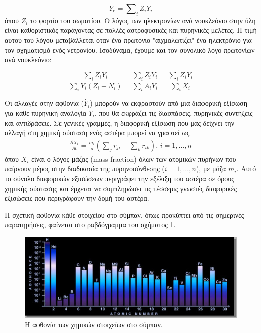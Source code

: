 \begin{equation}
Y_{e} = \sum\nolimits_{i} Z_{i} Y_{i}
\end{equation}
όπου $Z_{i}$ το φορτίο του σωματίου. Ο λόγος των ηλεκτρονίων ανά νουκλεόνιο στην ύλη είναι καθοριστικός παράγοντας σε πολλές αστροφυσικές και πυρηνικές μελέτες. Η τιμή αυτού του λόγου μεταβάλλεται όταν ένα πρωτόνιο "αιχμαλωτίζει" ένα ηλεκτρόνιο για τον σχηματισμό ενός νετρονίου.
Ισοδύναμα, έχουμε και τον συνολικό λόγο πρωτονίων ανά νουκλεόνιο:

\begin{equation}
\frac{\sum\nolimits_{i} Z_{i} Y_{i}}{ \sum\nolimits_{i} Y_{i}(Z_{i}+N_{i})}=\frac{\sum\nolimits_{i} Z_{i} Y_{i}}{ \sum\nolimits_{i} A_{i} Y_{i}}= \frac{\sum\nolimits_{i} Z_{i} Y_{i}}{\sum\nolimits_{i} X_{i}}
\end{equation}

Οι αλλαγές στην αφθονία ($\dot{Y_{i}}$) μπορούν να εκφραστούν από μια διαφορική εξίσωση για κάθε πυρηνική αναλογία $Y_{i}$, που θα εκφράζει τις διασπάσεις, πυρηνικές συντήξεις και αντιδράσεις. Σε γενικές γραμμές, η διαφορική εξίσωση που μας δείχνει την αλλαγή στη χημική σύσταση ενός αστέρα μπορεί να γραφτεί ως
\begin{eqnarray}
    \label{eq:composition_differential_equation}
    \boxed{\frac{\partial X_i}{\partial t} = \frac{m_i}{\rho} \left(\sum_j r_{ji} - \sum_k r_{ik} \right), \,i=1,\dots,n}
\end{eqnarray}
όπου $X_i$ είναι ο λόγος μάζας (mass fraction) όλων των ατομικών πυρήνων που παίρνουν μέρος στην διαδικασία της πυρηνοσύνθεσης ($i = 1,\dots,n$), με μάζα $m_i$. Αυτό το σύνολο διαφορικών εξισώσεων περιγράφει την εξέλιξη του αστέρα σε όρους χημικής σύστασης και έρχεται να συμπληρώσει τις τέσσερις γνωστές διαφορικές εξισώσεις που περιγράφουν την δομή του αστέρα.

Η σχετική αφθονία κάθε στοιχείου στο σύμπαν, όπως προκύπτει από τις σημερινές παρατηρήσεις, φαίνεται στο ραβδόγραμμα του σχήματος \ref{fig:abundace_of_elements}.

\begin{figure}
    \centering
    \includegraphics[scale=0.75]{Figures/atomic1.jpg} 
    \caption{Η αφθονία των χημικών στοιχείων στο σύμπαν.}  
    \label{fig:abundace_of_elements}
\end{figure}

